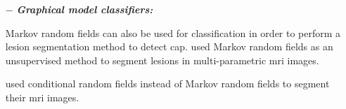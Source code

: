 \begin{enumerate}[leftmargin=*]
\item[$-$] \textbf{\textit{Graphical model classifiers:}}

Markov random fields can also be used for classification in order to perform a lesion segmentation method to detect \ac{cap}. %
%
%
%
%
%
\cite{Liu2009,Ozer2010} used Markov random fields as an unsupervised method to segment lesions in multi-parametric \ac{mri} images.

\cite{Artan2009,Artan2010} used conditional random fields instead of Markov random fields to segment their \ac{mri} images. %
%
%


\end{enumerate}
